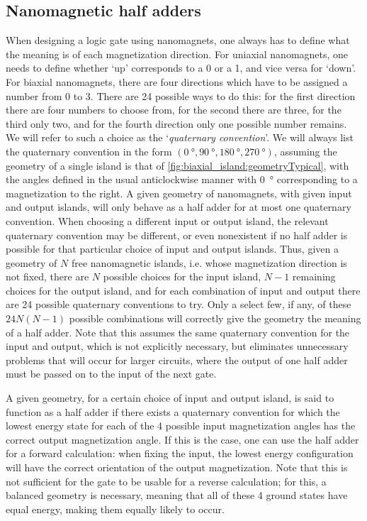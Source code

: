 \documentclass[11pt,a4paper,english,twoside]{article}
\begin{document}
\subsection{Nanomagnetic half adders}
When designing a logic gate using nanomagnets, one always has to define what the meaning is of each magnetization direction. For uniaxial nanomagnets, one needs to define whether `up' corresponds to a 0 or a 1, and vice versa for `down'. For biaxial nanomagnets, there are four directions which have to be assigned a number from 0 to 3. There are 24 possible ways to do this: for the first direction there are four numbers to choose from, for the second there are three, for the third only two, and for the fourth direction only one possible number remains. We will refer to such a choice as the `\textit{quaternary convention}'. We will always list the quaternary convention in the form $(\SI{0}{\degree}, \SI{90}{\degree}, \SI{180}{\degree}, \SI{270}{\degree})$, assuming the geometry of a single island is that of \cref{fig:biaxial_island:geometryTypical}, with the angles defined in the usual anticlockwise manner with \SI{0}{\degree} corresponding to a magnetization to the right. A given geometry of nanomagnets, with given input and output islands, will only behave as a half adder for at most one quaternary convention. When choosing a different input or output island, the relevant quaternary convention may be different, or even nonexistent if no half adder is possible for that particular choice of input and output islands. Thus, given a geometry of $N$ free nanomagnetic islands, i.e. whose magnetization direction is not fixed, there are $N$ possible choices for the input island, $N-1$ remaining choices for the output island, and for each combination of input and output there are 24 possible quaternary conventions to try. Only a select few, if any, of these $24N(N-1)$ possible combinations will correctly give the geometry the meaning of a half adder. Note that this assumes the same quaternary convention for the input and output, which is not explicitly necessary, but eliminates unnecessary problems that will occur for larger circuits, where the output of one half adder must be passed on to the input of the next gate. \par
A given geometry, for a certain choice of input and output island, is said to function as a half adder if there exists a quaternary convention for which the lowest energy state for each of the 4 possible input magnetization angles has the correct output magnetization angle. If this is the case, one can use the half adder for a forward calculation: when fixing the input, the lowest energy configuration will have the correct orientation of the output magnetization. Note that this is not sufficient for the gate to be usable for a reverse calculation; for this, a balanced geometry is necessary, meaning that all of these 4 ground states have equal energy, making them equally likely to occur. \par
\end{document}
